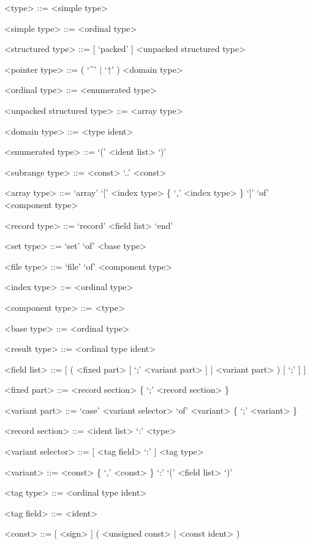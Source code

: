 \documentclass{article}
\begin{document}
{
  \begin{grammar}
    <type> ::= <simple type>  

    <simple type> ::= <ordinal type> 

    <structured type> ::= [ `packed' ] <unpacked structured type> 

    <pointer type> ::= ( `^' | `↑' ) <domain type> 

    <ordinal type> ::= <enumerated type>  

    <unpacked structured type> ::= <array type>   

    <domain type> ::= <type ident>

    <enumerated type> ::= `(' <ident list> `)'

    <subrange type> ::= <const> `..' <const>

    <array type> ::= `array' `[' <index type> \{ `,' <index type> \} `]' `of' <component type>

    <record type> ::= `record' <field list> `end'

    <set type> ::= `set' `of' <base type>

    <file type> ::= `file' `of' <component type>

    <index type> ::= <ordinal type>

    <component type> ::= <type>

    <base type> ::= <ordinal type>

    <result type> ::= <ordinal type ident>  

    <field list> ::= [ ( <fixed part> [ `;' <variant part> ] | <variant part> ) [ `;' ] ]

    <fixed part> ::= <record section> \{ `;' <record section> \}

    <variant part> ::= `case' <variant selector> `of' <variant> \{ `;' <variant> \}

    <record section> ::= <ident list> `:' <type>

    <variant selector> ::= [ <tag field> `:' ] <tag type>

    <variant> ::= <const> \{ `,' <const> \} `:' `(' <field list> `)'

    <tag type> ::= <ordinal type ident>

    <tag field> ::= <ident>

    <const> ::= [ <sign> ] ( <unsigned const> | <const ident> )
  \end{grammar}
}
\end{document}
